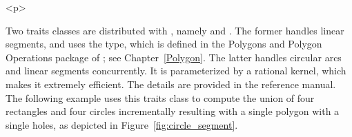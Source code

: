
\begin{ccHtmlOnly}<p>\end{ccHtmlOnly}
Two traits classes are distributed with \cgal, namely 
 and . 
The former handles linear segments, and uses the  type,
which is defined in the Polygons and Polygon Operations package of 
\cgal; see Chapter~\ref{Polygon}. The latter handles circular arcs
and linear segments concurrently. It is parameterized by a rational 
kernel, which makes it extremely efficient. The details are provided in the 
reference manual. The following example uses this traits class to compute
the union of four rectangles and four circles incrementally resulting with 
a single polygon with a single holes, as depicted in 
Figure~\ref{fig:circle_segment}.


